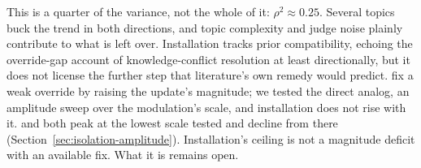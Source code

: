 This is a quarter of the variance, not the whole of it: \(\rho^2 \approx 0.25\). Several
topics buck the trend in both directions, and topic complexity and judge noise plainly
contribute to what is left over. Installation tracks prior compatibility, echoing the
override-gap account of knowledge-conflict resolution \citep{cheng2026overridegap} at
least directionally, but it does not license the further step that literature's own
remedy would predict. \citet{cheng2026overridegap} fix a weak override by raising the
update's magnitude; we tested the direct analog, an amplitude sweep over the
modulation's scale, and installation does not rise with it. \condC{} and \condF{} both
peak at the lowest
scale tested and decline from there\iflongversion{} (Section~\ref{sec:isolation-amplitude})\fi.
Installation's ceiling is not a magnitude deficit with an available fix. What it is
remains open.
